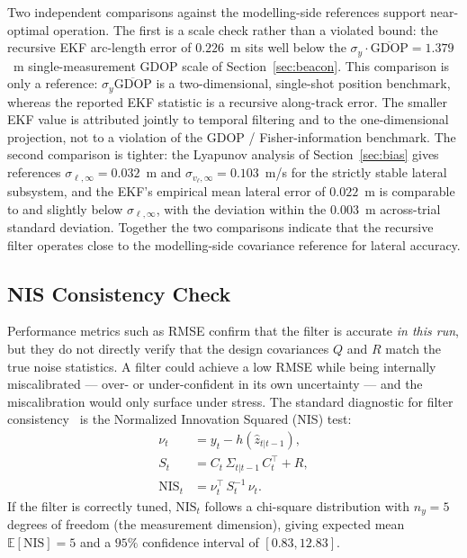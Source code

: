 \documentclass[11pt,a4paper]{article}
\begin{document}
Two independent comparisons against the modelling-side references
support near-optimal operation. The first is a scale check rather
than a violated bound: the recursive EKF arc-length error of
$0.226$~m sits well below the
$\sigma_y\cdot\overline{\mathrm{GDOP}}=1.379$~m single-measurement
GDOP scale of Section~\ref{sec:beacon}. This comparison is only a
reference: $\sigma_y\overline{\mathrm{GDOP}}$ is a two-dimensional,
single-shot position benchmark, whereas the reported EKF statistic
is a recursive along-track error. The smaller EKF value is
attributed jointly to temporal filtering and to the
one-dimensional projection, not to a violation of the GDOP /
Fisher-information benchmark. The second comparison is tighter:
the Lyapunov analysis of Section~\ref{sec:bias} gives references
$\sigma_{\ell,\infty}=0.032$~m and $\sigma_{v_\ell,\infty}=
0.103$~m/s for the strictly stable lateral subsystem, and the EKF's
empirical mean lateral error of $0.022$~m is comparable to and
slightly below $\sigma_{\ell,\infty}$, with the deviation within
the $0.003$~m across-trial standard deviation. Together the two
comparisons indicate that the recursive filter operates close to
the modelling-side covariance reference for lateral accuracy.

\subsection{NIS Consistency Check}
\label{sec:nis}

Performance metrics such as RMSE confirm that the filter is accurate
\emph{in this run}, but they do not directly verify that the design
covariances $Q$ and $R$ match the true noise statistics. A filter could
achieve a low RMSE while being internally miscalibrated --- over- or
under-confident in its own uncertainty --- and the miscalibration would
only surface under stress. The standard diagnostic for filter
consistency~\cite{Sopasakis_6_tutorial} is the Normalized Innovation
Squared (NIS) test:
\begin{equation}
\begin{aligned}
\nu_t          &= y_t - h(\hat{z}_{t|t-1}),\\
S_t            &= C_t\,\Sigma_{t|t-1}\,C_t^{\!\top}+R,\\
\mathrm{NIS}_t &= \nu_t^{\!\top}\,S_t^{-1}\,\nu_t.
\end{aligned}
\label{eq:nis}
\end{equation}
If the filter is correctly tuned, $\mathrm{NIS}_t$ follows a chi-square
distribution with $n_y=5$ degrees of freedom (the measurement
dimension), giving expected mean $\mathbb{E}[\mathrm{NIS}]=5$ and a
$95\%$ confidence interval of $[0.83, 12.83]$.
\end{document}
